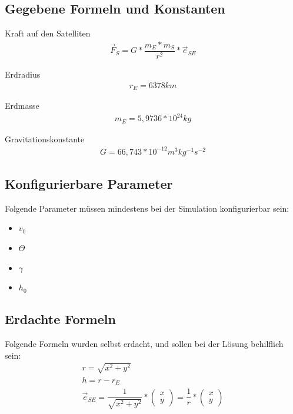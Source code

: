 \documentclass[]{scrartcl}
\begin{document}
\subsection{Gegebene Formeln und Konstanten}
Kraft auf den Satelliten
\begin{align}
\vec{F}_{S} = G * \dfrac{m_{E} * m_{S}}{r^2} * \vec{e}_{SE}
\end{align}

Erdradius
\begin{align}
r_{E} = 6378 km
\end{align}

Erdmasse
\begin{align}
m_{E} = 5,9736 * 10^{24} kg
\end{align}

Gravitationskonstante
\begin{align}
G = 66,743 * 10^{-12} m^{3} kg^{-1} s^{-2}
\end{align}

\subsection{Konfigurierbare Parameter}
Folgende Parameter müssen mindestens bei der Simulation konfigurierbar sein:
\begin{itemize}
\item $v_{0}$
\item $\Theta$
\item $\gamma$
\item $h_{0}$
\end{itemize}

\subsection{Erdachte Formeln}
Folgende Formeln wurden selbst erdacht, und sollen bei der Lösung behilflich sein:
\begin{align}
r = \sqrt{x^2 + y^2} \\
h = r - r_{E} \\
\vec{e}_{SE} = \dfrac{1}{\sqrt{x^2 + y^2}}* \begin{pmatrix}x\\y\end{pmatrix} = \dfrac{1}{r} * \begin{pmatrix}x\\y\end{pmatrix}
\end{align}

\end{document}
